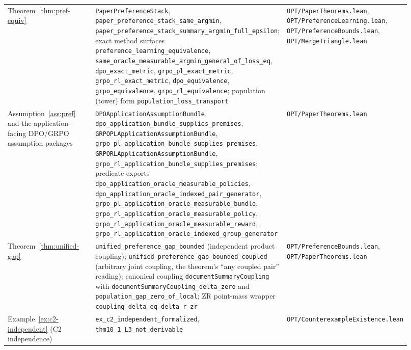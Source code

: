 {\begin{longtable}{p{0.28\linewidth}p{0.34\linewidth}p{0.30\linewidth}}
Theorem~\ref{thm:pref-equiv} &
\texttt{PaperPreferenceStack}, \texttt{paper\_preference\_stack\_same\_argmin}, \texttt{paper\_preference\_stack\_summary\_argmin\_full\_epsilon}; exact method surfaces \texttt{preference\_learning\_equivalence}, \texttt{same\_oracle\_measurable\_argmin\_general\_of\_loss\_eq}, \texttt{dpo\_exact\_metric}, \texttt{grpo\_pl\_exact\_metric}, \texttt{grpo\_rl\_exact\_metric}, \texttt{dpo\_equivalence}, \texttt{grpo\_equivalence}, \texttt{grpo\_rl\_equivalence}; population (tower) form \texttt{population\_loss\_transport} &
\texttt{OPT/PaperTheorems.lean}, \texttt{OPT/PreferenceLearning.lean}, \texttt{OPT/PreferenceBounds.lean}, \texttt{OPT/MergeTriangle.lean} \\

Assumption~\ref{ass:pref} and the application-facing DPO/GRPO assumption packages &
\texttt{DPOApplicationAssumptionBundle}, \texttt{dpo\_application\_bundle\_supplies\_premises}, \texttt{GRPOPLApplicationAssumptionBundle}, \texttt{grpo\_pl\_application\_bundle\_supplies\_premises}, \texttt{GRPORLApplicationAssumptionBundle}, \texttt{grpo\_rl\_application\_bundle\_supplies\_premises}; predicate exports \texttt{dpo\_application\_oracle\_measurable\_policies}, \texttt{dpo\_application\_oracle\_indexed\_pair\_generator}, \texttt{grpo\_pl\_application\_oracle\_measurable\_bundle}, \texttt{grpo\_rl\_application\_oracle\_measurable\_policy}, \texttt{grpo\_rl\_application\_oracle\_measurable\_reward}, \texttt{grpo\_rl\_application\_oracle\_indexed\_group\_generator} &
\texttt{OPT/PaperTheorems.lean} \\

Theorem~\ref{thm:unified-gap} &
\texttt{unified\_preference\_gap\_bounded} (independent product coupling);
\texttt{unified\_preference\_gap\_bounded\_coupled} (arbitrary joint coupling,
the theorem's ``any coupled pair'' reading); canonical coupling
\texttt{documentSummaryCoupling} with
\texttt{documentSummaryCoupling\_delta\_zero} and
\texttt{population\_gap\_zero\_of\_local}; ZR point-mass wrapper
\texttt{coupling\_delta\_eq\_delta\_r\_zr} &
\texttt{OPT/PreferenceBounds.lean}, \texttt{OPT/PaperTheorems.lean} \\

Example~\ref{ex:c2-independent} (C2 independence) &
\texttt{ex\_c2\_independent\_formalized}, \texttt{thm10\_1\_L3\_not\_derivable} &
\texttt{OPT/CounterexampleExistence.lean} \\


\end{longtable}}
